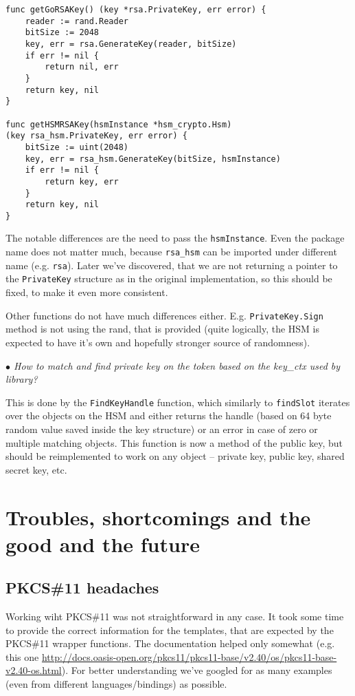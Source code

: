 \documentclass[a4paper]{scrartcl}
\begin{document}
\begin{lstlisting}[caption=Comparison of the original and HSM implementations, captionpos=b, label={lst:rsaComp}]
func getGoRSAKey() (key *rsa.PrivateKey, err error) {
    reader := rand.Reader
    bitSize := 2048
    key, err = rsa.GenerateKey(reader, bitSize)
    if err != nil {
        return nil, err
    }
    return key, nil
}

func getHSMRSAKey(hsmInstance *hsm_crypto.Hsm)
(key rsa_hsm.PrivateKey, err error) {
    bitSize := uint(2048)
    key, err = rsa_hsm.GenerateKey(bitSize, hsmInstance)
    if err != nil {
        return key, err
    }
    return key, nil
}
\end{lstlisting}

The notable differences are the need to pass the \lstinline[columns=fixed]{hsmInstance}. Even the package name does not matter much, because \lstinline[columns=fixed]{rsa_hsm} can be imported under different name (e.g. \lstinline[columns=fixed]{rsa}). Later we've discovered, that we are not returning a pointer to the \lstinline[columns=fixed]{PrivateKey} structure as in the original implementation, so this should be fixed, to make it even more consistent.

Other functions do not have much differences either. E.g. \lstinline[columns=fixed]{PrivateKey.Sign} method is not using the rand, that is provided (quite logically, the HSM is expected to have it's own and hopefully stronger source of randomness).

\textit{$\bullet$ How to match and find private key on the token based on the key\_ctx used by library?}

This is done by the \lstinline[columns=fixed]{FindKeyHandle} function, which similarly to \lstinline[columns=fixed]{findSlot} iterates over the objects on the HSM and either returns the handle (based on 64 byte random value saved inside the key structure) or an error in case of zero or multiple matching objects. This function is now a method of the public key, but should be reimplemented to work on any object -- private key, public key, shared secret key, etc.

\section{Troubles, shortcomings and the good and the future}

\subsection{PKCS\#11 headaches}
Working wiht PKCS\#11 was not straightforward in any case. It took some time to provide the correct information for the templates, that are expected by the PKCS\#11 wrapper functions. The documentation helped only somewhat (e.g. this one \url{http://docs.oasis-open.org/pkcs11/pkcs11-base/v2.40/os/pkcs11-base-v2.40-os.html}). For better understanding we've googled for as many examples (even from different languages/bindings) as possible.
\end{document}
